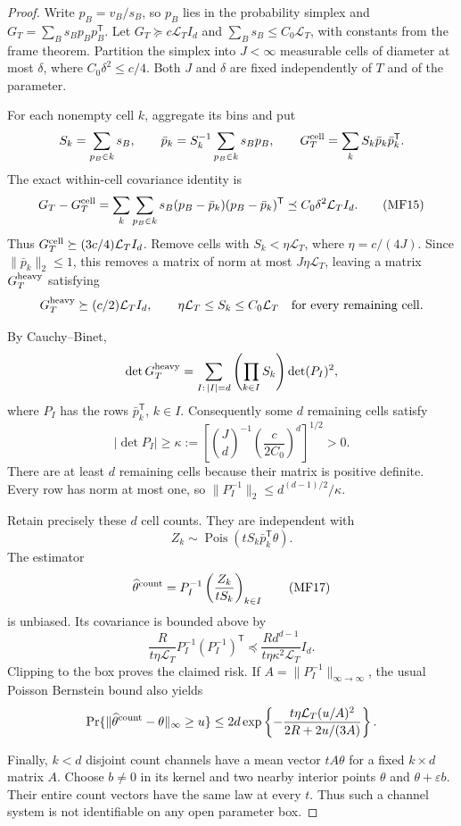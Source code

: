 \begin{proof}
Write $p_B=v_B/s_B$, so $p_B$ lies in the probability simplex and
$G_T=\sum_Bs_Bp_Bp_B^{\mathsf T}$.  Let
$G_T\succeq c\mathcal L_T I_d$ and
$\sum_Bs_B\le C_0\mathcal L_T$, with constants from the frame theorem.
Partition the simplex into $J<\infty$ measurable cells of diameter at
most $\delta$, where $C_0\delta^2\le c/4$.  Both $J$ and $\delta$ are
fixed independently of $T$ and of the parameter.

For each nonempty cell $k$, aggregate its bins and put
\[
 S_k=\sum_{p_B\in k}s_B,\qquad
 \bar p_k=S_k^{-1}\sum_{p_B\in k}s_Bp_B,
 \qquad G_T^{\rm cell}=\sum_k S_k\bar p_k\bar p_k^{\mathsf T}.
\]
The exact within-cell covariance identity is
\[
 G_T-G_T^{\rm cell}
 =\sum_k\sum_{p_B\in k}s_B
          (p_B-\bar p_k)(p_B-\bar p_k)^{\mathsf T}
 \preceq C_0\delta^2\mathcal L_T I_d.
\tag{MF15}
\]
Thus $G_T^{\rm cell}\succeq(3c/4)\mathcal L_T I_d$.
Remove cells with $S_k<\eta\mathcal L_T$, where $\eta=c/(4J)$.
Since $\|\bar p_k\|_2\le1$, this removes a matrix of norm at most
$J\eta\mathcal L_T$, leaving a matrix $G_T^{\rm heavy}$ satisfying
\[
 G_T^{\rm heavy}\succeq(c/2)\mathcal L_T I_d,
 \qquad \eta\mathcal L_T\le S_k\le C_0\mathcal L_T
 \quad\hbox{for every remaining cell}.
\]

By Cauchy--Binet,
\[
 \det G_T^{\rm heavy}
 =\sum_{I:\,|I|=d}\left(\prod_{k\in I}S_k\right)
                 \det(P_I)^2,
\]
where $P_I$ has the rows $\bar p_k^{\mathsf T}$, $k\in I$.
Consequently some $d$ remaining cells satisfy
\[
 |\det P_I|\ge
 \kappa:=\left[\binom Jd^{-1}
                   \left(\frac{c}{2C_0}\right)^d\right]^{1/2}>0.
\tag{MF16}
\]
There are at least $d$ remaining cells because their matrix is positive
definite.  Every row has norm at most one, so
$\|P_I^{-1}\|_2\le d^{(d-1)/2}/\kappa$.

Retain precisely these $d$ cell counts.  They are independent with
\[
 Z_k\sim\operatorname{Pois}(tS_k\bar p_k^{\mathsf T}\theta).
\]
The estimator
\[
 \widehat\theta^{\rm count}
 =P_I^{-1}\left(\frac{Z_k}{tS_k}\right)_{k\in I}
\tag{MF17}
\]
is unbiased.  Its covariance is bounded above by
\[
 \frac{R}{t\eta\mathcal L_T}
                P_I^{-1}(P_I^{-1})^{\mathsf T}
 \preceq\frac{R d^{d-1}}{t\eta\kappa^2\mathcal L_T}I_d.
\]
Clipping to the box proves the claimed risk.  If
$A=\|P_I^{-1}\|_{\infty\to\infty}$, the usual Poisson Bernstein bound
also yields
\[
 \Pr\{\|\widehat\theta^{\rm count}-\theta\|_\infty\ge u\}
 \le2d\exp\left\{-\frac{t\eta\mathcal L_T(u/A)^2}
                              {2R+2u/(3A)}\right\}.
\]

Finally, $k<d$ disjoint count channels have a mean vector $tA\theta$ for
a fixed $k\times d$ matrix $A$.  Choose $b\ne0$ in its kernel and two
nearby interior points $\theta$ and $\theta+\varepsilon b$.  Their entire
count vectors have the same law at every $t$.  Thus such a channel system
is not identifiable on any open parameter box.
\end{proof}

